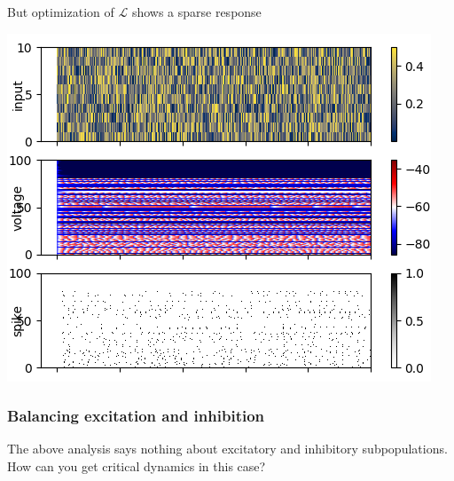 \documentclass{beamer}
\begin{document}
\begin{frame}[plain]
\frametitle{} 

But optimization of $\mathcal{L}$ shows a sparse response

\begin{center}
\includegraphics[scale=0.7]{alpha-traces}
\end{center}

\end{frame}


\begin{frame}[plain]
\frametitle{Balancing excitation and inhibition} 
The above analysis says nothing about excitatory and inhibitory subpopulations. How can you get critical dynamics in this case?

\end{frame}
\end{document}
